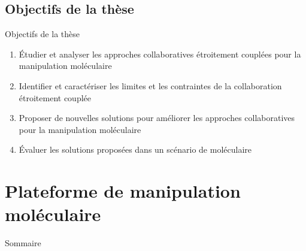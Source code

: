 \documentclass[english,french,dvips,10pt]{mybeamer}
\begin{document}
	\subsection{Objectifs de la thèse}
	\begin{myframe}{Objectifs de la thèse}
		\vfill
		\begin{enumerate}
			\item Étudier et analyser les approches collaboratives étroitement couplées pour la manipulation moléculaire
				\vfill
			\item Identifier et caractériser les limites et les contraintes de la collaboration étroitement couplée
				\vfill
			\item Proposer de nouvelles solutions pour améliorer les approches collaboratives pour la manipulation moléculaire
				\vfill
			\item Évaluer les solutions proposées dans un scénario de \mydocking moléculaire
		\end{enumerate}
		\vfill
	\end{myframe}
	\section{Plateforme de manipulation moléculaire \myShaddock}
	\begin{myframe}{Sommaire}
		\tableofcontents[sectionstyle=show/shaded,subsectionstyle=show/show/hide,subsubsectionstyle=show/show/hide]
	\end{myframe}
\end{document}
